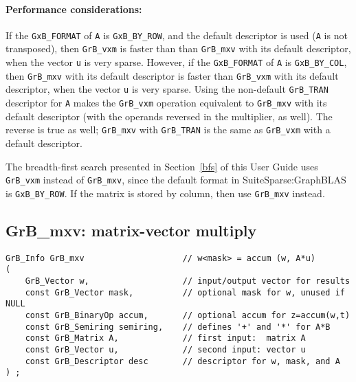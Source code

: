 \documentclass[12pt]{article}
\begin{document}
\paragraph{\bf Performance considerations:} %
If the \verb'GxB_FORMAT' of \verb'A' is \verb'GxB_BY_ROW', and the default
descriptor is used (\verb'A' is not transposed), then \verb'GrB_vxm' is faster
than than \verb'GrB_mxv' with its default descriptor, when the vector \verb'u'
is very sparse.
However, if the \verb'GxB_FORMAT' of \verb'A' is \verb'GxB_BY_COL', then
\verb'GrB_mxv' with its default descriptor is faster than \verb'GrB_vxm' with
its default descriptor, when the vector \verb'u' is very sparse.
Using the non-default \verb'GrB_TRAN' descriptor for \verb'A' makes the
\verb'GrB_vxm' operation equivalent to \verb'GrB_mxv' with its default
descriptor (with the operands reversed in the multiplier, as well).  The
reverse is true as well; \verb'GrB_mxv' with \verb'GrB_TRAN' is the same as
\verb'GrB_vxm' with a default descriptor.

The breadth-first search presented in Section~\ref{bfs} of this User Guide uses
\verb'GrB_vxm' instead of \verb'GrB_mxv', since the default format in
SuiteSparse:GraphBLAS is \verb'GxB_BY_ROW'.  If the matrix is stored by column,
then use \verb'GrB_mxv' instead.

\newpage
\subsection{{\sf GrB\_mxv:} matrix-vector multiply} %
\label{mxv}

\begin{mdframed}[userdefinedwidth=6in]
{\footnotesize
\begin{verbatim}
GrB_Info GrB_mxv                    // w<mask> = accum (w, A*u)
(
    GrB_Vector w,                   // input/output vector for results
    const GrB_Vector mask,          // optional mask for w, unused if NULL
    const GrB_BinaryOp accum,       // optional accum for z=accum(w,t)
    const GrB_Semiring semiring,    // defines '+' and '*' for A*B
    const GrB_Matrix A,             // first input:  matrix A
    const GrB_Vector u,             // second input: vector u
    const GrB_Descriptor desc       // descriptor for w, mask, and A
) ;
\end{verbatim} } \end{mdframed}
\end{document}
